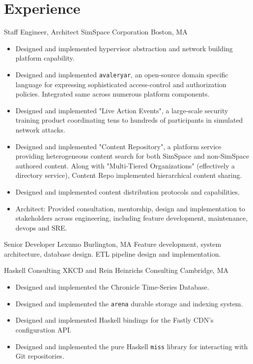 \documentclass[10pt,letterpaper,sans]{moderncv}
\begin{document}
\makecvtitle

\section{Experience}

        {Staff Engineer, Architect}
        {SimSpace Corporation}
        {Boston, MA}
        {}
        {%
          \begin{itemize}
            \item Designed and implemented hypervisor abstraction and network building platform
              capability.
            \item Designed and implemented \texttt{avaleryar}, an open-source domain specific
              language for expressing sophisticated access-control and authorization policies.
              Integrated same across numerous platform components.
            \item Designed and implemented "Live Action Events", a large-scale security training
              product coordinating tens to hundreds of participants in simulated network attacks.
            \item Designed and implemented "Content Repository", a platform service providing
              heterogeneous content search for both SimSpace and non-SimSpace authored content.
              Along with "Multi-Tiered Organizations" (effectively a directory service), Content
              Repo implemented hierarchical content sharing.
            \item Designed and implemented content distribution protocols and capabilities.
            \item Architect: Provided consultation, mentorship, design and implementation to
              stakeholders across engineering, including feature development, maintenance,
              devops and SRE.
          \end{itemize}
        }

        {Senior Developer}
        {Lexumo}
        {Burlington, MA}
        {}
        {%
          Feature development, system architecture, database design.  ETL pipeline design
          and implementation.
        }

        {Haskell Consulting}
        {XKCD and Rein Heinrichs Consulting}
        {Cambridge, MA}
        {}
        {%
          \begin{itemize}
          \item Designed and implemented the Chronicle Time-Series Database.
          \item Designed and implemented the \texttt{arena} durable storage and indexing system.
          \item Designed and implemented Haskell bindings for the Fastly CDN's configuration API.
          \item Designed and implemented the pure Haskell \texttt{miss} library for interacting with
            Git repositories.
          \end{itemize}
        }
\end{document}
